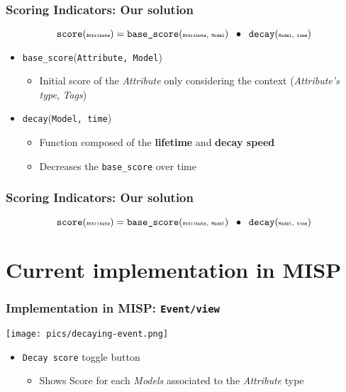 \begin{frame}
    \frametitle{Scoring Indicators: Our solution}
    $$ \texttt{score}(\texttt{\tiny Attribute}) = \texttt{base\_score}(\texttt{\tiny Attribute, Model}) \;\;\bullet\;\; \texttt{decay}(\texttt{\tiny Model, time}) $$
    \begin{itemize}
        \item \texttt{base\_score}(\texttt{\tiny Attribute, Model})
            \begin{itemize}
                \item Initial score of the \textit{Attribute} only considering the context (\textit{Attribute's type}, \textit{Tags})
            \end{itemize}
        \vspace{1cm}
        \item \texttt{decay}(\texttt{\tiny Model, time})
            \begin{itemize}
                \item Function composed of the \textbf{lifetime} and \textbf{decay speed} 
                \item Decreases the \texttt{base\_score} over time
            \end{itemize}
    \end{itemize}
\end{frame}


\begin{frame}
    \frametitle{Scoring Indicators: Our solution}
    $$ \texttt{score}(\texttt{\tiny Attribute}) = \texttt{base\_score}(\texttt{\tiny Attribute, Model}) \;\;\bullet\;\; \texttt{decay}(\texttt{\tiny Model, time}) $$
    \begin{center}
    \end{center}
\end{frame}

\section{Current implementation in MISP}
\begin{frame}
    \frametitle{Implementation in MISP: \texttt{Event/view}}
    \texttt{[image: pics/decaying-event.png]}
    \begin{itemize}
        \item \texttt{Decay score} toggle button
        \begin{itemize}
            \item Shows Score for each \textit{Models} associated to the \textit{Attribute} type
        \end{itemize}
    \end{itemize}
\end{frame}


